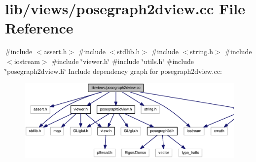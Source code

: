 \section{lib/views/posegraph2dview.cc \-File \-Reference}
\label{posegraph2dview_8cc}
{\ttfamily \#include $<$assert.\-h$>$}\*
{\ttfamily \#include $<$stdlib.\-h$>$}\*
{\ttfamily \#include $<$string.\-h$>$}\*
{\ttfamily \#include $<$iostream$>$}\*
{\ttfamily \#include \char`\"{}viewer.\-h\char`\"{}}\*
{\ttfamily \#include \char`\"{}utils.\-h\char`\"{}}\*
{\ttfamily \#include \char`\"{}posegraph2dview.\-h\char`\"{}}\*
\-Include dependency graph for posegraph2dview.\-cc\-:
\nopagebreak
\begin{figure}[H]
\begin{center}
\leavevmode
\includegraphics[width=350pt]{posegraph2dview_8cc__incl}
\end{center}
\end{figure}
